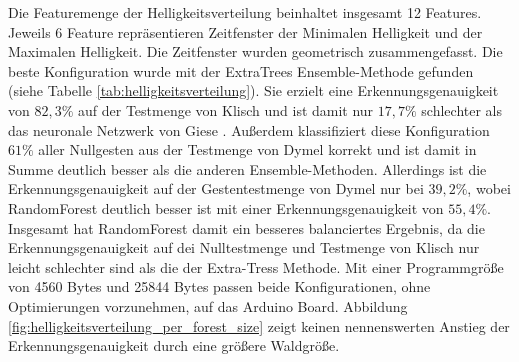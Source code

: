 Die Featuremenge der Helligkeitsverteilung beinhaltet insgesamt 12 Features. Jeweils 6 Feature repräsentieren Zeitfenster der Minimalen Helligkeit und der Maximalen Helligkeit. Die Zeitfenster wurden
geometrisch zusammengefasst.
\newline
\newline
Die beste Konfiguration wurde mit der ExtraTrees Ensemble-Methode gefunden (siehe Tabelle \ref{tab:helligkeitsverteilung}). Sie erzielt eine Erkennungsgenauigkeit von $82,3\%$ auf der Testmenge von Klisch
und ist damit nur $17,7\%$ schlechter als das neuronale Netzwerk von Giese \cite{gieseThesis}. Außerdem klassifiziert diese Konfiguration $61\%$ aller Nullgesten aus der Testmenge von Dymel korrekt und ist
damit in Summe deutlich besser als die anderen Ensemble-Methoden. Allerdings ist die Erkennungsgenauigkeit auf der Gestentestmenge von Dymel nur bei $39,2\%$, wobei RandomForest deutlich besser ist mit
einer Erkennungsgenauigkeit von $55,4\%$. Insgesamt hat RandomForest damit ein besseres balanciertes Ergebnis, da die Erkennungsgenauigkeit auf dei Nulltestmenge und Testmenge von Klisch nur leicht
schlechter sind als die der Extra-Tress Methode. Mit einer Programmgröße von 4560 Bytes und 25844 Bytes passen beide Konfigurationen, ohne Optimierungen vorzunehmen, auf das Arduino Board.
\newline
\newline
Abbildung \ref{fig:helligkeitsverteilung_per_forest_size} zeigt keinen nennenswerten Anstieg der Erkennungsgenauigkeit durch eine größere Waldgröße.